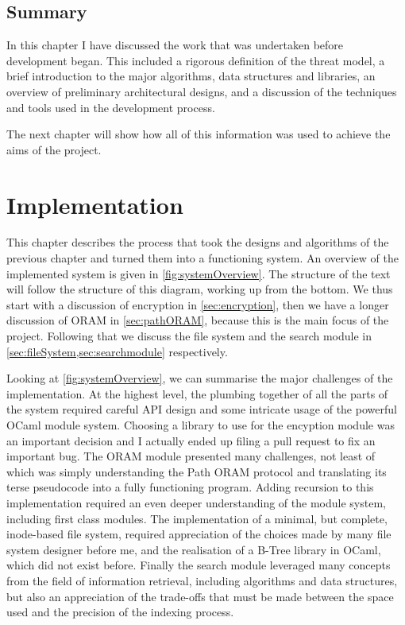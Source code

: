 \documentclass[12pt,a4paper,twoside,openright]{report}
\begin{document}
\section{Summary}

In this chapter I have discussed the work that was undertaken before development began. This included a rigorous definition of the threat model, a brief introduction to the major algorithms, data structures and libraries, an overview of preliminary architectural designs, and a discussion of the techniques and tools used in the development process.

The next chapter will show how all of this information was used to achieve the aims of the project.

\chapter{Implementation}

This chapter describes the process that took the designs and algorithms of the previous chapter and turned them into a functioning system. An overview of the implemented system is given in \cref{fig:systemOverview}. The structure of the text will follow the structure of this diagram, working up from the bottom. We thus start with a discussion of encryption in \cref{sec:encryption}, then we have a longer discussion of ORAM in \cref{sec:pathORAM}, because this is the main focus of the project. Following that we discuss the file system and the search module in \cref{sec:fileSystem,sec:searchmodule} respectively.

Looking at \cref{fig:systemOverview}, we can summarise the major challenges of the implementation. At the highest level, the plumbing together of all the parts of the system required careful API design and some intricate usage of the powerful OCaml module system. Choosing a library to use for the encyption module was an important decision and I actually ended up filing a pull request to fix an important bug. The ORAM module presented many challenges, not least of which was simply understanding the Path ORAM protocol and translating its terse pseudocode into a fully functioning program. Adding recursion to this implementation required an even deeper understanding of the module system, including first class modules. The implementation of a minimal, but complete, inode-based file system, required appreciation of the choices made by many file system designer before me, and the realisation of a B-Tree library in OCaml, which did not exist before. Finally the search module leveraged many concepts from the field of information retrieval, including algorithms and data structures, but also an appreciation of the trade-offs that must be made between the space used and the precision of the indexing process.
\end{document}
